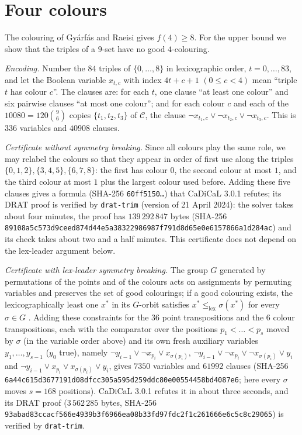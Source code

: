 \documentclass[11pt]{amsart}
\theoremstyle{definition}
\theoremstyle{remark}
\newcommand{\C}{\mathcal{C}}
\begin{document}
\section{Four colours}\label{sec:r4}

The colouring of Gy\'arf\'as and Raeisi gives $f(4)\ge8$. For the upper bound we show that the triples of a $9$-set
have no good $4$-colouring.

\emph{Encoding.} Number the $84$ triples of $\{0,\dots,8\}$ in lexicographic order, $t=0,\dots,83$, and let the Boolean
variable $x_{t,c}$ with index $4t+c+1$ $(0\le c<4)$ mean ``triple $t$ has colour $c$''. The clauses are: for each $t$,
one clause ``at least one colour'' and six pairwise clauses ``at most one colour''; and for each colour $c$ and each of
the $10080=120\binom96$ copies $\{t_1,t_2,t_3\}$ of $\C$, the clause $\neg x_{t_1,c}\vee\neg x_{t_2,c}\vee\neg x_{t_3,c}$.
This is $336$ variables and $40908$ clauses.

\emph{Certificate without symmetry breaking.} Since all colours play the same role, we may relabel the colours so that
they appear in order of first use along the triples $\{0,1,2\},\{3,4,5\},\{6,7,8\}$: the first has colour $0$, the
second colour at most $1$, and the third colour at most $1$ plus the largest colour used before. Adding these
five clauses gives a formula (SHA-256 \texttt{60ff5150\dots}) that CaDiCaL 3.0.1 refutes; its DRAT proof is verified by
\texttt{drat-trim} (version of 21 April 2024): the solver takes about four minutes, the proof has
$139\,292\,847$ bytes (SHA-256 \texttt{89108a5c573d9ceed874d44e5a383229}\-\texttt{86987f791d8d65e0e6157866a1d284ac}) and
its check takes about two and a half minutes. This certificate does not depend on the lex-leader argument below.

\emph{Certificate with lex-leader symmetry breaking.} The group $G$ generated by permutations of the points and of the
colours acts on assignments by permuting variables and preserves the set of good colourings; if a good colouring
exists, the lexicographically least one $x^*$ in its $G$-orbit satisfies $x^*\le_{\mathrm{lex}}\sigma(x^*)$ for every
$\sigma\in G$ \cite{CGLR}. Adding these constraints for the $36$ point transpositions and the $6$ colour transpositions,
each with the comparator over the positions $p_1<\dots<p_s$ moved by $\sigma$ (in the variable order above) and its own
fresh auxiliary variables $y_1,\dots,y_{s-1}$ ($y_0$ true), namely $\neg y_{i-1}\vee\neg x_{p_i}\vee x_{\sigma(p_i)}$,
$\neg y_{i-1}\vee\neg x_{p_i}\vee\neg x_{\sigma(p_i)}\vee y_i$ and $\neg y_{i-1}\vee x_{p_i}\vee x_{\sigma(p_i)}\vee y_i$,
gives $7350$ variables and $61992$ clauses (SHA-256 \texttt{6a44c615d3677191d08dfcc305a595d2}\-\texttt{59ddc80e00554458bd4087e6};
here every $\sigma$ moves $s=168$ positions). CaDiCaL 3.0.1 refutes it in about three seconds, and its DRAT proof
($3\,562\,285$ bytes, SHA-256 \texttt{93abad83ccacf566e4939b3f6966ea08}\-\texttt{b33fd97fdc2f1c261666e6c5c8c29065})
is verified by \texttt{drat-trim}.
\end{document}
